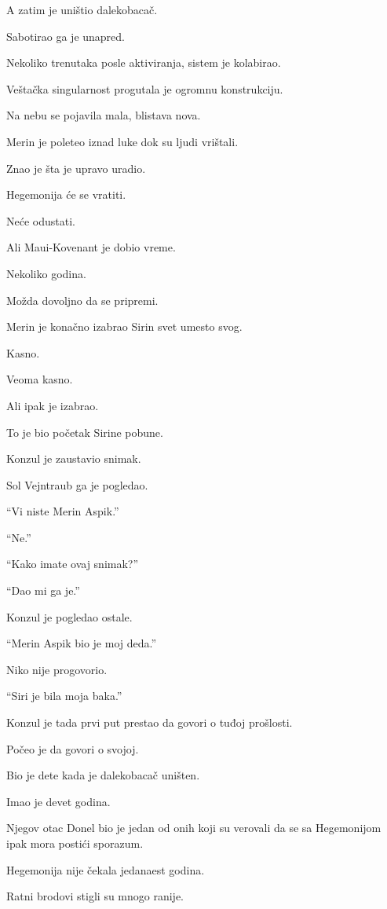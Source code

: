 A zatim je uništio dalekobacač.

\bigskip

Sabotirao ga je unapred.

Nekoliko trenutaka posle aktiviranja, sistem je kolabirao.

Veštačka singularnost progutala je ogromnu konstrukciju.

Na nebu se pojavila mala, blistava nova.

Merin je poleteo iznad luke dok su ljudi vrištali.

Znao je šta je upravo uradio.

Hegemonija će se vratiti.

Neće odustati.

Ali Maui-Kovenant je dobio vreme.

Nekoliko godina.

Možda dovoljno da se pripremi.

Merin je konačno izabrao Sirin svet umesto svog.

Kasno.

Veoma kasno.

Ali ipak je izabrao.

To je bio početak Sirine pobune.

\bigskip

Konzul je zaustavio snimak.

Sol Vejntraub ga je pogledao.

``Vi niste Merin Aspik.''

``Ne.''

``Kako imate ovaj snimak?''

``Dao mi ga je.''

Konzul je pogledao ostale.

``Merin Aspik bio je moj deda.''

Niko nije progovorio.

``Siri je bila moja baka.''

Konzul je tada prvi put prestao da govori o tuđoj prošlosti.

Počeo je da govori o svojoj.

\bigskip

Bio je dete kada je dalekobacač uništen.

Imao je devet godina.

Njegov otac Donel bio je jedan od onih koji su verovali da se sa Hegemonijom ipak mora postići sporazum.

Hegemonija nije čekala jedanaest godina.

Ratni brodovi stigli su mnogo ranije.

